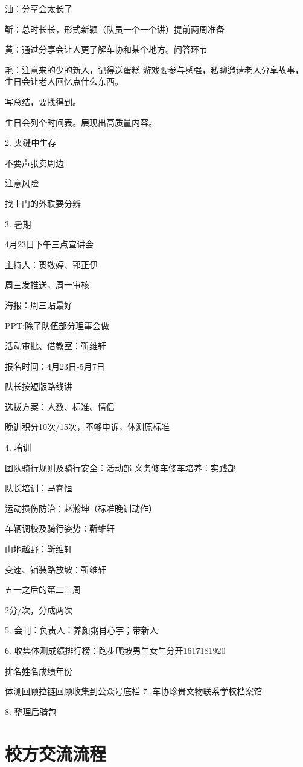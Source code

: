 \documentclass{ctexbook}
\begin{document}
油：分享会太长了

靳：总时长长，形式新颖（队员一个一个讲）提前两周准备

黄：通过分享会让人更了解车协和某个地方。问答环节

毛：注意来的少的新人，记得送蛋糕
游戏要参与感强，私聊邀请老人分享故事，生日会让老人回忆点什么东西。

写总结，要找得到。

生日会列个时间表。展现出高质量内容。

2.	夹缝中生存

不要声张卖周边	


注意风险

找上门的外联要分辨

3.	暑期

4月23日下午三点宣讲会

主持人：贺敬婷、郭正伊

周三发推送，周一审核

海报：周三贴最好  

PPT:除了队伍部分理事会做

活动审批、借教室：靳维轩

报名时间：4月23日-5月7日

队长按短版路线讲

选拔方案：人数、标准、情侣

晚训积分10次/15次，不够申诉，体测原标准

4.	培训

团队骑行规则及骑行安全：活动部
义务修车修车培养：实践部

队长培训：马睿恒

运动损伤防治：赵瀚坤（标准晚训动作）

车辆调校及骑行姿势：靳维轩

山地越野：靳维轩

变速、铺装路放坡：靳维轩

五一之后的第二三周

2分/次，分成两次

5.	会刊：负责人：养颜粥肖心宇；带新人

6.	收集体测成绩排行榜：跑步爬坡男生女生分开1617181920


排名姓名成绩年份

体测回顾拉链回顾收集到公众号底栏
7.	车协珍贵文物联系学校档案馆

8.	整理后骑包

\chapter{校方交流流程} 
\end{document}
